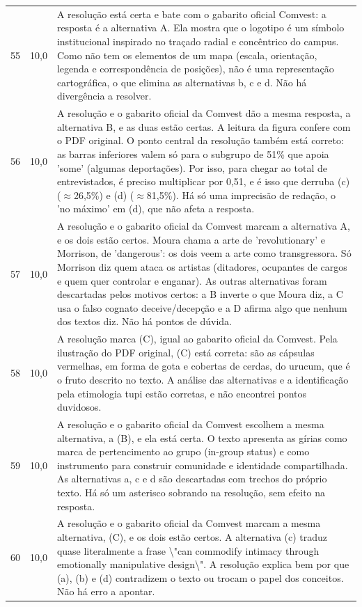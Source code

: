 \documentclass{article}%
\begin{document}
\begin{longtable}{@{}c c p{}@{}}
55 & 10,0 & A resolução está certa e bate com o gabarito oficial Comvest: a resposta é a alternativa A. Ela mostra que o logotipo é um símbolo institucional inspirado no traçado radial e concêntrico do campus. Como não tem os elementos de um mapa (escala, orientação, legenda e correspondência de posições), não é uma representação cartográfica, o que elimina as alternativas b, c e d. Não há divergência a resolver. \\
56 & 10,0 & A resolução e o gabarito oficial da Comvest dão a mesma resposta, a alternativa B, e as duas estão certas. A leitura da figura confere com o PDF original. O ponto central da resolução também está correto: as barras inferiores valem só para o subgrupo de 51\% que apoia 'some' (algumas deportações). Por isso, para chegar ao total de entrevistados, é preciso multiplicar por 0,51, e é isso que derruba (c) ($\approx$26,5\%) e (d) ($\approx$81,5\%). Há só uma imprecisão de redação, o 'no máximo' em (d), que não afeta a resposta. \\
57 & 10,0 & A resolução e o gabarito oficial da Comvest marcam a alternativa A, e os dois estão certos. Moura chama a arte de 'revolutionary' e Morrison, de 'dangerous': os dois veem a arte como transgressora. Só Morrison diz quem ataca os artistas (ditadores, ocupantes de cargos e quem quer controlar e enganar). As outras alternativas foram descartadas pelos motivos certos: a B inverte o que Moura diz, a C usa o falso cognato deceive/decepção e a D afirma algo que nenhum dos textos diz. Não há pontos de dúvida. \\
58 & 10,0 & A resolução marca (C), igual ao gabarito oficial da Comvest. Pela ilustração do PDF original, (C) está correta: são as cápsulas vermelhas, em forma de gota e cobertas de cerdas, do urucum, que é o fruto descrito no texto. A análise das alternativas e a identificação pela etimologia tupi estão corretas, e não encontrei pontos duvidosos. \\
59 & 10,0 & A resolução e o gabarito oficial da Comvest escolhem a mesma alternativa, a (B), e ela está certa. O texto apresenta as gírias como marca de pertencimento ao grupo (in{-}group status) e como instrumento para construir comunidade e identidade compartilhada. As alternativas a, c e d são descartadas com trechos do próprio texto. Há só um asterisco sobrando na resolução, sem efeito na resposta. \\
60 & 10,0 & A resolução e o gabarito oficial da Comvest marcam a mesma alternativa, (C), e os dois estão certos. A alternativa (c) traduz quase literalmente a frase \textbackslash{}"can commodify intimacy through emotionally manipulative design\textbackslash{}". A resolução explica bem por que (a), (b) e (d) contradizem o texto ou trocam o papel dos conceitos. Não há erro a apontar. \\

\end{longtable}
\end{document}

